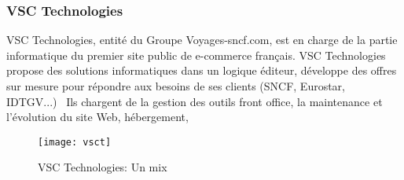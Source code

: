 \subsubsection{VSC Technologies}
VSC Technologies, entité du Groupe Voyages-sncf.com,
est en charge de la partie informatique du premier site public de e-commerce français.
VSC Technologies propose des solutions informatiques dans un logique éditeur,
développe des offres sur mesure pour répondre aux besoins de ses clients (SNCF, Eurostar, IDTGV...) 
Ils chargent de la gestion des outils front office, la maintenance et l'évolution du site Web, hébergement,

\begin{figure}[ht]
 \centering
 \texttt{[image: vsct]}
 \caption{VSC Technologies: Un mix}
 \label{fig:vsct}
\end{figure}

\clearpage
